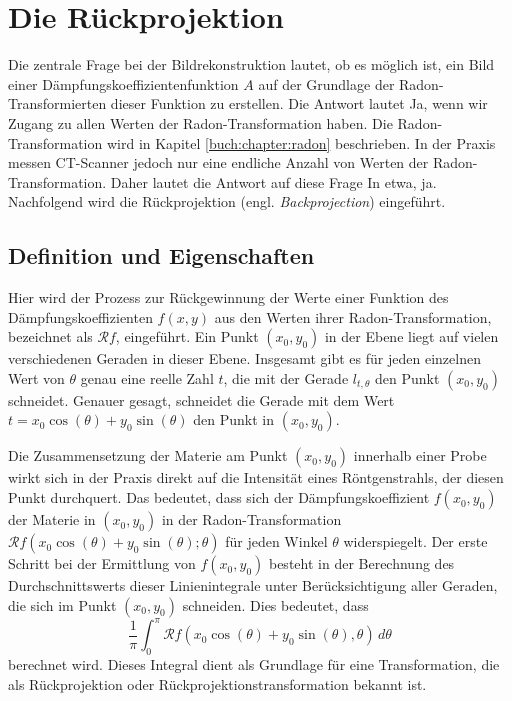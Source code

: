 %
%
%
%
\section{Die Rückprojektion
	\label{ct:section:ruekprojektion}}
Die zentrale Frage bei der Bildrekonstruktion lautet, ob es möglich ist, ein Bild einer Dämpfungskoeffizientenfunktion $A$ auf der Grundlage der Radon-Transformierten dieser Funktion zu erstellen. Die Antwort lautet \glqq Ja\grqq, wenn wir Zugang zu allen Werten der Radon-Transformation haben. Die Radon-Transformation wird in Kapitel \ref{buch:chapter:radon} beschrieben. In der Praxis messen CT-Scanner jedoch nur eine endliche Anzahl von Werten der Radon-Transformation. Daher lautet die Antwort auf diese Frage \glqq In etwa, ja\grqq. Nachfolgend wird die Rückprojektion (engl. \emph{Backprojection}) eingeführt.  

\subsection{Definition und Eigenschaften
	\label{ct:subsection:defnprop}}
Hier wird der Prozess zur Rückgewinnung der Werte einer Funktion des Dämpfungskoeffizienten $f(x, y)$ aus den Werten ihrer Radon-Transformation, bezeichnet als $\mathscr{R}f$, eingeführt. Ein Punkt $(x_0, y_0)$ in der Ebene liegt auf vielen verschiedenen Geraden in dieser Ebene. Insgesamt gibt es für jeden einzelnen Wert von $\theta$ genau eine reelle Zahl $t$, die mit der Gerade $l_{t,\theta}$ den Punkt $(x_0, y_0)$ schneidet. Genauer gesagt, schneidet die Gerade mit dem Wert $t = x_0\cos(\theta) + y_0\sin(\theta)$ den Punkt in $(x_0, y_0)$.  

Die Zusammensetzung der Materie am Punkt $(x_0, y_0)$ innerhalb einer Probe wirkt sich in der Praxis direkt auf die Intensität eines Röntgenstrahls, der diesen Punkt durchquert. Das bedeutet, dass sich der Dämpfungskoeffizient $f(x_0, y_0)$ der Materie in $(x_0, y_0)$ in der Radon-Transformation $\mathscr{R}f(x_0\cos(\theta) + y_0\sin(\theta); \theta)$ für jeden Winkel $\theta$ widerspiegelt. Der erste Schritt bei der Ermittlung von $f(x_0, y_0)$ besteht in der Berechnung des Durchschnittswerts dieser Linienintegrale unter Berücksichtigung aller Geraden, die sich im Punkt $(x_0, y_0)$ schneiden. Dies bedeutet, dass
\begin{equation}
	\dfrac{1}{\pi}\int_{0}^{\pi} \mathscr{R}f(x_0\cos(\theta) + y_0\sin(\theta), \theta) \,d\theta
\end{equation}
berechnet wird. Dieses Integral dient als Grundlage für eine Transformation, die als Rückprojektion oder Rückprojektionstransformation bekannt ist.

